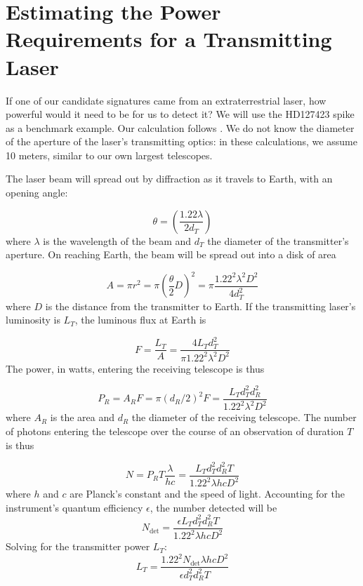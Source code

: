 \documentclass[twocolumn]{aastex701}
\begin{document}
\section{Estimating the Power Requirements for a Transmitting Laser}
If one of our candidate signatures came from an extraterrestrial laser, how powerful would it need to be for us to detect it?  We will use the HD127423 spike as a benchmark example.  Our calculation follows \cite{Lipman_2019}.  We do not know the diameter of the aperture of the laser’s transmitting optics: in these calculations, we assume 10 meters, similar to our own largest telescopes.

The laser beam will spread out by diffraction as it travels to Earth, with an opening angle:

\begin{equation}
    \theta = (\frac{1.22\lambda}{2d_T})
\end{equation}
where $\lambda$ is the wavelength of the beam and $d_T$ the diameter of the transmitter's aperture.  On reaching Earth, the beam will be spread out into a disk of area

\begin{equation}
    A = \pi r^2 = \pi (\frac{\theta}{2} D)^2 = \pi \frac{1.22^2 \lambda^2 D^2}{4 d_T^2}
\end{equation}
where $D$ is the distance from the transmitter to Earth.  If the transmitting laser's luminosity is $L_T$, the luminous flux at Earth is

\begin{equation}
    F = \frac{L_T}{A} = \frac{4 L_T d_T^2}{\pi 1.22^2 \lambda^2 D^2}
\end{equation}
The power, in watts, entering the receiving telescope is thus

\begin{equation}
    P_R = A_R F = \pi (d_R/2)^2 F = \frac{L_T d_T^2 d_R^2}{1.22^2 \lambda^2 D^2}
\end{equation}
where $A_R$ is the area and $d_R$ the diameter of the receiving telescope.  The number of photons entering the telescope over the course of an observation of duration $T$ is thus

\begin{equation}
    N = P_R T \frac{\lambda}{h c} = \frac{L_T d_T^2 d_R^2 T}{1.22^2 \lambda h c D^2}
\end{equation}
where $h$ and $c$ are Planck's constant and the speed of light.  Accounting for the instrument's quantum efficiency $\epsilon$, the number detected will be
\begin{equation}
    N_{\mbox{det}} = \frac{\epsilon L_T d_T^2 d_R^2 T}{1.22^2 \lambda h c D^2}
\end{equation}
Solving for the transmitter power $L_T$:
\begin{equation}
    L_T = \frac{1.22^2 N_{\mbox{det}} \lambda h c D^2}{\epsilon d_T^2 d_R^2 T}
\end{equation}
\end{document}
